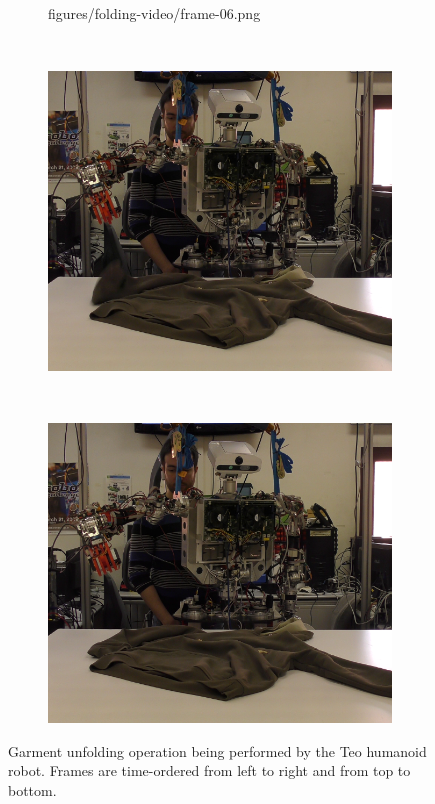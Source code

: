 \begin{figure}[htbp]
\begin{subfigure}[c]{\videofigurewidth}
    	{figures/folding-video/frame-06.png}  	
	\end{subfigure}
	~
    \begin{subfigure}[c]{\videofigurewidth}
	    \centering
    	\includegraphics[width=\textwidth]
    	{figures/folding-video/frame-07.png}
	\end{subfigure}
	~
    \begin{subfigure}[c]{\videofigurewidth}
	    \centering
    	\includegraphics[width=\textwidth]
    	{figures/folding-video/frame-08.png}
	\end{subfigure} 
    \caption[Garment unfolding operation being performed by the Teo humanoid robot]
    {Garment unfolding operation being performed by the Teo humanoid robot. Frames are time-ordered from left to right and from top to bottom.}
    \label{fig:video}
\end{figure}